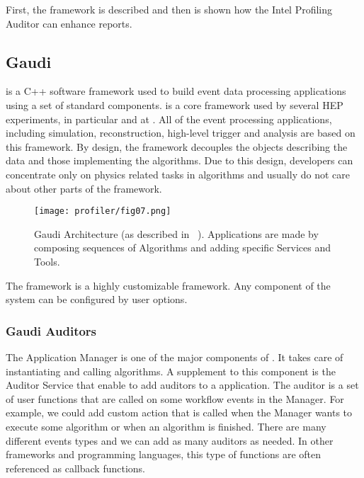 First, the \gaudi framework is described and then is shown how the \gaudi Intel
Profiling Auditor can enhance \amp reports.

\subsection{Gaudi}
\label{sec:gaudi}
\gaudi is a C++ software framework used to build event data processing
applications using a set of standard components. \gaudi is a core framework used
by several HEP experiments, in particular \lhcb and \atlas at \lhc. All of the
event processing applications, including simulation, reconstruction, high-level
trigger and analysis are based on this framework. By design, the framework
decouples the objects  describing the data and those implementing the
algorithms. Due to this design,  developers can concentrate only on  physics
related tasks in algorithms and usually do not care about other parts of the
framework.

\begin{figure}[H]
\begin{minipage}{\textwidth}
\texttt{[image: profiler/fig07.png]}
\caption{\label{fig07}Gaudi Architecture (as described in
~\cite{Barrand:2001ny}). Applications are made by composing sequences of
Algorithms and adding specific Services and Tools.}
\end{minipage}
\end{figure}

The \gaudi framework is a highly customizable framework. Any component of the
system can be configured by user options.

\subsubsection{Gaudi Auditors}

The Application Manager is one of the major components of \gaudi. It takes care
of instantiating and calling algorithms. A supplement to this component  is the
Auditor Service that enable to add auditors to a \gaudi application. The auditor
is a set of user functions that are called on some workflow events in the
Manager. For example, we could add custom action that is called when the
Manager wants to execute some algorithm or when an algorithm is finished. There
are many different events types and we can add as many auditors as needed. In
other frameworks and programming languages, this type of functions are often
referenced as callback functions.

